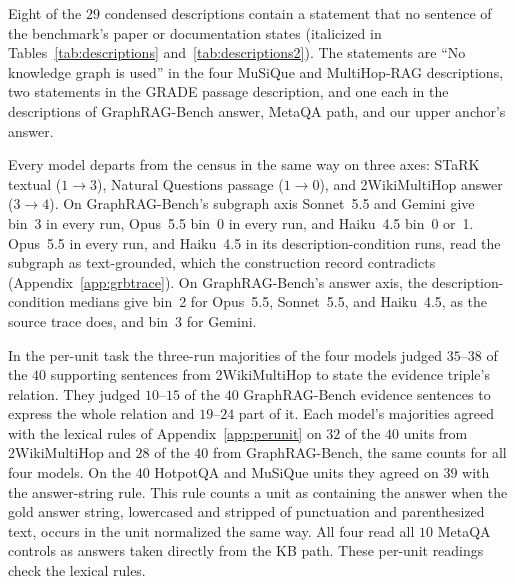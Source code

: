 \documentclass[11pt]{article}
\begin{document}
Eight of the $29$ condensed descriptions contain a statement that no sentence of the benchmark's paper or documentation states (italicized in Tables~\ref{tab:descriptions} and~\ref{tab:descriptions2}). The statements are ``No knowledge graph is used'' in the four MuSiQue and MultiHop-RAG descriptions, two statements in the GRADE passage description, and one each in the descriptions of GraphRAG-Bench answer, MetaQA path, and our upper anchor's answer.

Every model departs from the census in the same way on three axes: STaRK textual ($1\to3$), Natural Questions passage ($1\to0$), and 2WikiMultiHop answer ($3\to4$). On GraphRAG-Bench's subgraph axis Sonnet~5.5 and Gemini give bin~3 in every run, Opus~5.5 bin~0 in every run, and Haiku~4.5 bin~0 or~1. Opus~5.5 in every run, and Haiku~4.5 in its description-condition runs, read the subgraph as text-grounded, which the construction record contradicts (Appendix~\ref{app:grbtrace}). On GraphRAG-Bench's answer axis, the description-condition medians give bin~2 for Opus~5.5, Sonnet~5.5, and Haiku~4.5, as the source trace does, and bin~3 for Gemini.

In the per-unit task the three-run majorities of the four models judged $35$--$38$ of the $40$ supporting sentences from 2WikiMultiHop to state the evidence triple's relation. They judged $10$--$15$ of the $40$ GraphRAG-Bench evidence sentences to express the whole relation and $19$--$24$ part of it. Each model's majorities agreed with the lexical rules of Appendix~\ref{app:perunit} on $32$ of the $40$ units from 2WikiMultiHop and $28$ of the $40$ from GraphRAG-Bench, the same counts for all four models. On the $40$ HotpotQA and MuSiQue units they agreed on $39$ with the answer-string rule. This rule counts a unit as containing the answer when the gold answer string, lowercased and stripped of punctuation and parenthesized text, occurs in the unit normalized the same way. All four read all $10$ MetaQA controls as answers taken directly from the KB path. These per-unit readings check the lexical rules.
\end{document}
